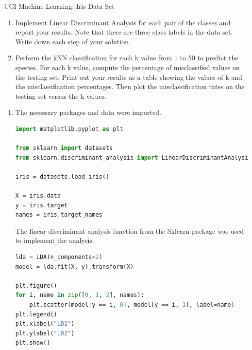 \documentclass{homework}
\begin{document}
\begin{solution}
\begin{solution}
\end{solution}

\newpage
\begin{problem}[5]
    UCI Machine Learning: Iris Data Set 
    
    \begin{enumerate}[label=\alph*.]
        \item Implement Linear Discriminant Analysis for each pair of the classes and report your results. Note that there are three class labels in the data set. Write down each step of your solution.  
 
        \item Perform the kNN classification for each k value from 1 to 50 to predict the species. For each k value, compute the percentage of misclassified values on the testing set. Print out your results as a table showing the values of k and the misclassification percentages. Then plot the misclassification rates on the testing set versus the k values. 
    \end{enumerate}
\end{problem}

\begin{solution}

\begin{enumerate}[label=\alph*.]
    \item The necessary packages and data were imported. 

\begin{lstlisting}[language=Python]
import matplotlib.pyplot as plt

from sklearn import datasets
from sklearn.discriminant_analysis import LinearDiscriminantAnalysis as LDA

iris = datasets.load_iris()

X = iris.data
y = iris.target
names = iris.target_names
\end{lstlisting}

The linear discriminant analysis function from the Sklearn package was used to implement the analysis.  

\begin{lstlisting}[language=Python, firstnumber=12]
lda = LDA(n_components=2)
model = lda.fit(X, y).transform(X)

plt.figure()
for i, name in zip([0, 1, 2], names):
    plt.scatter(model[y == i, 0], model[y == i, 1], label=name)
plt.legend()
plt.xlabel("LD1")
plt.ylabel("LD2")
plt.show()
\end{lstlisting}


\end{enumerate}
\end{solution}
\end{solution}
\end{document}
